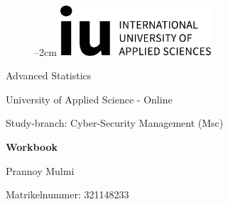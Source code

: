 
\label{titlePage}
\begin{figure}[h]
\centering
\advance\leftskip--2cm
\includegraphics[width=0.50\textwidth]{pics/logo.pdf}
\end{figure}
\FloatBarrier

\begin{Large} 
\begin{center}
Advanced Statistics
\end{center}
\end{Large} 

\vspace*{5mm}

\begin{large} 
\begin{center}
University of Applied Science - Online
\end{center}
\end{large} 

\begin{large} 
\begin{center}
Study-branch: Cyber-Security Management (Msc) 
\end{center}
\end{large}

\vspace*{15mm}

\begin{Large} 
\begin{center}
\textbf{Workbook}
\end{center}
\end{Large}

\vspace*{15mm}

\begin{large} 
\begin{center}
Prannoy Mulmi
\end{center}
\end{large} 

\vspace*{-6mm}

\begin{large} 
\begin{center}
Matrikelnummer: 321148233
\end{center}
\end{large} 

